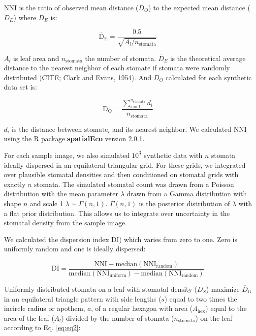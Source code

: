 \documentclass[12pt,halfline,a4paper,]{ouparticle}
\begin{document}
\(\mathrm{NNI}\) is the ratio of observed mean distance
(\(\overline{D}_O\)) to the expected mean distance (\(\overline{D}_E\))
where \(\overline{D}_E\) is:

\begin{equation}\label{eq:emd}
  \mathrm{\overline{D}_E} = \frac{0.5}{\sqrt{A_l/n_\text{stomata}}}
\end{equation}

\(A_l\) is leaf area and \(n_\text{stomata}\) the number of stomata.
\(\overline{D}_E\) is the theoretical average distance to the nearest
neighbor of each stomate if stomata were randomly distributed (CITE;
Clark and Evans, 1954). And \(\overline{D}_O\) calculated for each
synthetic data set is:

\begin{equation}\label{eq:omd}
  \mathrm{\overline{D}_O} = \frac{\sum_{i=1}^{n_\text{stomata}}d_i}{n_\text{stomata}}
\end{equation}

\(d_i\) is the distance between \(\text{stomate}_i\) and its nearest
neighbor. We calculated \(\mathrm{NNI}\) using the R package
\textbf{spatialEco} version 2.0.1.

For each sample image, we also simulated \(10^3\) synthetic data with
\(n\) stomata ideally dispersed in an equilateral triangular grid. For
these grids, we integrated over plausible stomatal densities and then
conditioned on stomatal grids with exactly \(n\) stomata. The simulated
stomatal count was drawn from a Poisson distribution with the mean
parameter \(\lambda\) drawn from a Gamma distribution with shape \(n\)
and scale 1 \(\lambda \sim \Gamma(n, 1)\). \(\Gamma(n, 1)\) is the
posterior distribution of \(\lambda\) with a flat prior distribution.
This allows us to integrate over uncertainty in the stomatal density
from the sample image.

We calculated the dispersion index \(\mathrm{DI}\)) which varies from
zero to one. Zero is uniformly random and one is ideally dispersed:

\begin{equation}\label{eq:disp}
  \mathrm{DI} = \frac{\mathrm{NNI} - \text{median}(\mathrm{NNI_{random}})}{\text{median}(\mathrm{NNI_{uniform}}) - \text{median}(\mathrm{NNI_{random}})}
\end{equation}

Uniformly distributed stomata on a leaf with stomatal density (\(D_S\))
maximize \(\overline{D}_O\) in an equilateral triangle pattern with side
lengths (\(s\)) equal to two times the incircle radius or apothem,
\(a\), of a regular hexagon with area (\(A_\text{hex}\)) equal to the
area of the leaf (\(A_l\)) divided by the number of stomata
(\(n_\text{stomata}\)) on the leaf according to Eq. \ref{eq:eq2}:
\end{document}
